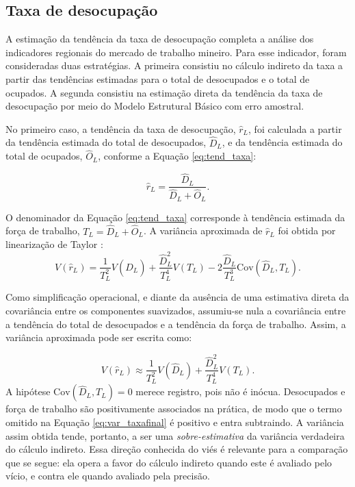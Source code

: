 \documentclass[rbe,wwwview]{econbr}
\begin{document}
\clearpage
\subsection{Taxa de desocupação}

A estimação da tendência da taxa de desocupação completa a análise dos indicadores regionais do mercado de trabalho mineiro. Para esse indicador, foram consideradas duas estratégias. A primeira consistiu no cálculo indireto da taxa a partir das tendências estimadas para o total de desocupados e o total de ocupados. A segunda consistiu na estimação direta da tendência da taxa de desocupação por meio do Modelo Estrutural Básico com erro amostral.

No primeiro caso, a tendência da taxa de desocupação, \(\hat{r}_L\), foi calculada a partir da tendência estimada do total de desocupados, \(\hat{D}_L\), e da tendência estimada do total de ocupados, \(\hat{O}_L\), conforme a Equação \ref{eq:tend_taxa}:

\vspace{-0.5cm}
\begin{equation}
    \hat{r}_L = \frac{\hat{D}_L}{\hat{D}_L+\hat{O}_L}.
    \label{eq:tend_taxa}
\end{equation}

\noindent
O denominador da Equação \ref{eq:tend_taxa} corresponde à tendência estimada da força de trabalho, \(T_L=\hat{D}_L+\hat{O}_L\). A variância aproximada de \(\hat{r}_L\) foi obtida por linearização de Taylor \citep{silva2021}:
\begin{equation}
    V(\hat{r}_L) =
    \frac{1}{T_L^2}V(\hat{D}_L)
    + \frac{\hat{D}_L^2}{T_L^4}V(T_L)
    - 2\frac{\hat{D}_L}{T_L^3}\mathrm{Cov}(\hat{D}_L,T_L).
    \label{eq:var_taxa}
\end{equation}

\noindent
Como simplificação operacional, e diante da ausência de uma estimativa direta da covariância entre os componentes suavizados, assumiu-se nula a covariância entre a tendência do total de desocupados e a tendência da força de trabalho. Assim, a variância aproximada pode ser escrita como:

\vspace{-0.5cm}
\begin{equation}
    V(\hat{r}_L) \approx
    \frac{1}{T_L^2}V(\hat{D}_L)
    + \frac{\hat{D}_L^2}{T_L^4}V(T_L).
    \label{eq:var_taxafinal}
\end{equation}
A hipótese \(\mathrm{Cov}(\hat{D}_L,T_L)=0\) merece registro, pois não é inócua. Desocupados e força de trabalho são positivamente associados na prática, de modo que o termo omitido na Equação \ref{eq:var_taxafinal} é positivo e entra subtraindo. A variância assim obtida tende, portanto, a ser uma \textit{sobre-estimativa} da variância verdadeira do cálculo indireto. Essa direção conhecida do viés é relevante para a comparação que se segue: ela opera a favor do cálculo indireto quando este é avaliado pelo vício, e contra ele quando avaliado pela precisão.
\end{document}
